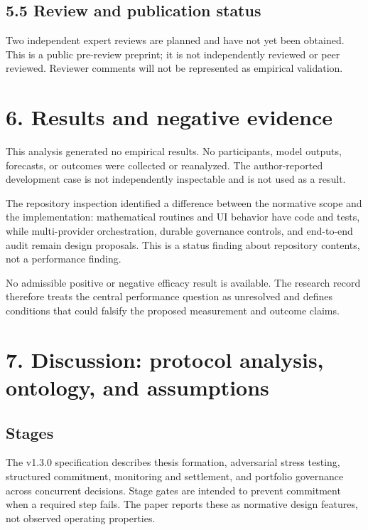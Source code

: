 \documentclass[
  english,
]{article}
\begin{document}
\subsection{5.5 Review and publication
status}\label{review-and-publication-status}

Two independent expert reviews are planned and have not yet been
obtained. This is a public pre-review preprint; it is not independently
reviewed or peer reviewed. Reviewer comments will not be represented as
empirical validation.

\section{6. Results and negative
evidence}\label{results-and-negative-evidence}

This analysis generated no empirical results. No participants, model
outputs, forecasts, or outcomes were collected or reanalyzed. The
author-reported development case is not independently inspectable and is
not used as a result.

The repository inspection identified a difference between the normative
scope and the implementation: mathematical routines and UI behavior have
code and tests, while multi-provider orchestration, durable governance
controls, and end-to-end audit remain design proposals. This is a status
finding about repository contents, not a performance finding.

No admissible positive or negative efficacy result is available. The
research record therefore treats the central performance question as
unresolved and defines conditions that could falsify the proposed
measurement and outcome claims.

\section{7. Discussion: protocol analysis, ontology, and
assumptions}\label{discussion-protocol-analysis-ontology-and-assumptions}

\subsection{Stages}\label{stages}

The v1.3.0 specification describes thesis formation, adversarial stress
testing, structured commitment, monitoring and settlement, and portfolio
governance across concurrent decisions. Stage gates are intended to
prevent commitment when a required step fails. The paper reports these
as normative design features, not observed operating properties.
\end{document}
